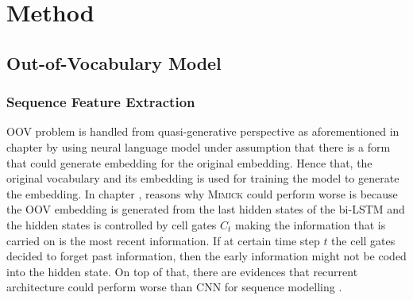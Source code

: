 \chapter{Method}
\label{chap:method}

\section{Out-of-Vocabulary Model}
    \subsection{Sequence Feature Extraction}
        OOV problem is handled from quasi-generative perspective as
        aforementioned in chapter  by using neural
        language model under assumption that there is a form that
        could generate embedding for the original embedding. Hence
        that, the original vocabulary and its embedding is used for
        training the model to generate the embedding. In chapter
        , reasons why \textsc{Mimick} could
        perform worse is because the OOV embedding is generated from
        the last hidden states of the bi-LSTM and the hidden states is
        controlled by cell gates $C_t$ making the information that is
        carried on is the most recent information. If at certain time
        step $t$ the cell gates decided to forget past information,
        then the early information might not be coded into the hidden
        state. On top of that, there are evidences that recurrent
        architecture could perform worse than CNN for sequence
        modelling \citep{empirical2018shaujie}. 
        
